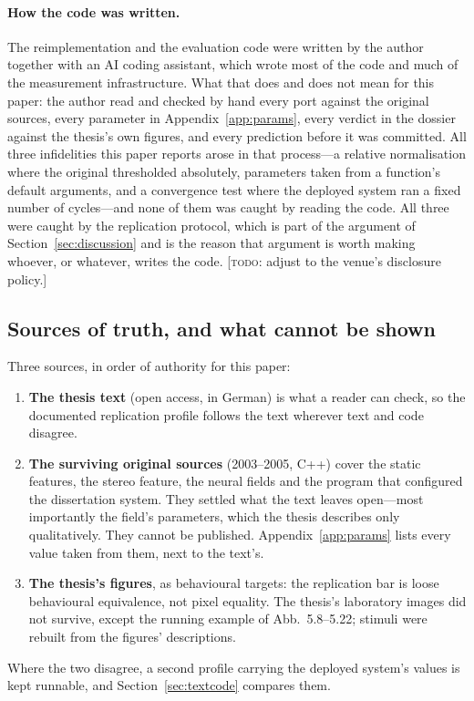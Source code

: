 \documentclass[11pt,a4paper]{article}
\newcommand{\todo}[1]{\textcolor{red!70!black}{[\textsc{todo:} #1]}}
\newcommand{\todo}[1]{}
\begin{document}
\paragraph{How the code was written.} The reimplementation and the evaluation
code were written by the author together with an AI coding assistant, which
wrote most of the code and much of the measurement infrastructure. What that
does and does not mean for this paper: the author read and checked by hand every
port against the original sources, every parameter in Appendix~\ref{app:params},
every verdict in the dossier against the thesis's own figures, and every
prediction before it was committed. All three infidelities this paper reports
arose in that process---a relative normalisation where the original thresholded
absolutely, parameters taken from a function's default arguments, and a
convergence test where the deployed system ran a fixed number of cycles---and
none of them was caught by reading the code. All three were caught by the
replication protocol, which is part of the argument of
Section~\ref{sec:discussion} and is the reason that argument is worth making
whoever, or whatever, writes the code. \todo{adjust to the
venue's disclosure policy.}

\subsection{Sources of truth, and what cannot be shown}
\label{sec:sources}
Three sources, in order of authority for this paper:
\begin{enumerate}
  \item \textbf{The thesis text} (open access, in German) is what a reader can
        check, so the documented replication profile follows the text wherever
        text and code disagree.
  \item \textbf{The surviving original sources} (2003--2005, C++) cover the
        static features, the stereo feature, the neural fields and the program
        that configured the dissertation system. They settled what the text
        leaves open---most importantly the field's parameters, which the thesis
        describes only qualitatively. They cannot be published. Appendix~\ref{app:params}
        lists every value taken from them, next to the text's.
  \item \textbf{The thesis's figures}, as behavioural targets: the replication
        bar is loose behavioural equivalence, not pixel equality. The thesis's
        laboratory images did not survive, except the running example of
        Abb.~5.8--5.22; stimuli were rebuilt from the figures' descriptions.
\end{enumerate}
Where the two disagree, a second profile carrying the deployed system's values
is kept runnable, and Section~\ref{sec:textcode} compares them.
\end{document}
